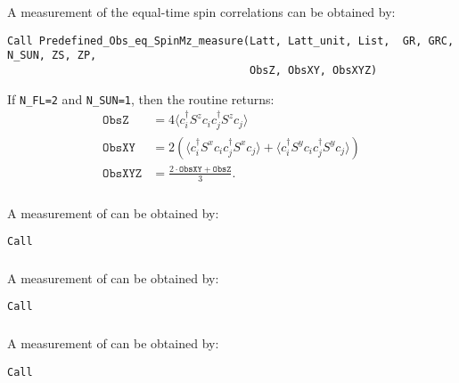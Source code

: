 A measurement of the equal-time spin correlations can be obtained by:

\begin{lstlisting}[style=fortran]
Call Predefined_Obs_eq_SpinMz_measure(Latt, Latt_unit, List,  GR, GRC, N_SUN, ZS, ZP,
                                      ObsZ, ObsXY, ObsXYZ)
\end{lstlisting}

If \texttt{N\_FL=2} and \texttt{N\_SUN=1}, then the routine returns:
\begin{align}
\texttt{ObsZ}   &=  4 \langle c^{\dagger}_i S^z c_i  c^{\dagger}_j S^z  c_j\rangle \\  
\texttt{ObsXY}  &=  2 \left( \langle c^{\dagger}_i S^x c_i  c^{\dagger}_j S^x  c_j\rangle  +   \langle c^{\dagger}_i S^y c_i  c^{\dagger}_j S^y  c_j\rangle \right)\\
\texttt{ObsXYZ} &=  \frac{2\cdot\texttt{ObsXY} + \texttt{ObsZ}}{3}.
\end{align}


\subsubsection{}

A measurement of  can be obtained by:

\begin{lstlisting}[style=fortran]
Call 
\end{lstlisting}

\subsubsection{}

A measurement of  can be obtained by:

\begin{lstlisting}[style=fortran]
Call 
\end{lstlisting}

\subsubsection{}

A measurement of  can be obtained by:

\begin{lstlisting}[style=fortran]
Call 
\end{lstlisting}

\subsubsection{}

